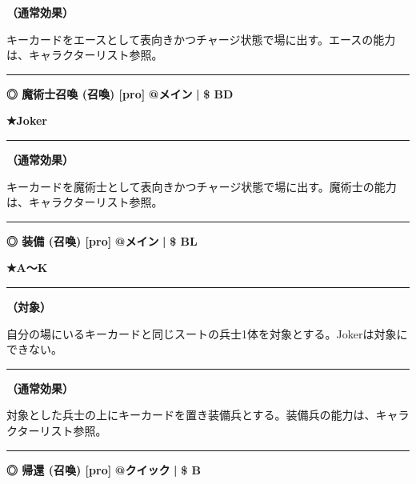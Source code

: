 \documentclass[twocolumn,a5paper,papersize,10pt]{jarticle}
\begin{document}
{\bf（通常効果）}

キーカードをエースとして表向きかつチャージ状態で場に出す。エースの能力は、キャラクターリスト参照。
\vspace{2mm} %
\hrule height 0.5mm depth 0mm width 66.5mm %
\vspace{1mm} %
{\small\bf ◎ 魔術士召喚 {\scriptsize (召喚) [pro]}} %
\hfill 
{\footnotesize\bf @メイン }
  {\footnotesize\bf | } {\footnotesize\bf \$ BD}

{\footnotesize\bf ★Joker}

\vspace{1mm}%
\hrule height 0.1mm depth 0mm width 66.5mm %
\vspace{1mm}%

{\bf（通常効果）}

キーカードを魔術士として表向きかつチャージ状態で場に出す。魔術士の能力は、キャラクターリスト参照。
\vspace{2mm} %
\hrule height 0.5mm depth 0mm width 66.5mm %
\vspace{1mm} %
{\small\bf ◎ 装備 {\scriptsize (召喚) [pro]}} %
\hfill 
{\footnotesize\bf @メイン }
  {\footnotesize\bf | } {\footnotesize\bf \$ BL}

{\footnotesize\bf ★A〜K}

\vspace{1mm}%
\hrule height 0.1mm depth 0mm width 66.5mm %
\vspace{1mm}%
{\bf（対象）}

自分の場にいるキーカードと同じスートの兵士1体を対象とする。Jokerは対象にできない。
\vspace{1mm}%
\hrule height 0.1mm depth 0mm width 66.5mm %
\vspace{1mm}%

{\bf（通常効果）}

対象とした兵士の上にキーカードを置き装備兵とする。装備兵の能力は、キャラクターリスト参照。
\vspace{2mm} %
\hrule height 0.5mm depth 0mm width 66.5mm %
\vspace{1mm} %
{\small\bf ◎ 帰還 {\scriptsize (召喚) [pro]}} %
\hfill 
{\footnotesize\bf @クイック }
  {\footnotesize\bf | } {\footnotesize\bf \$ B}
\end{document}
